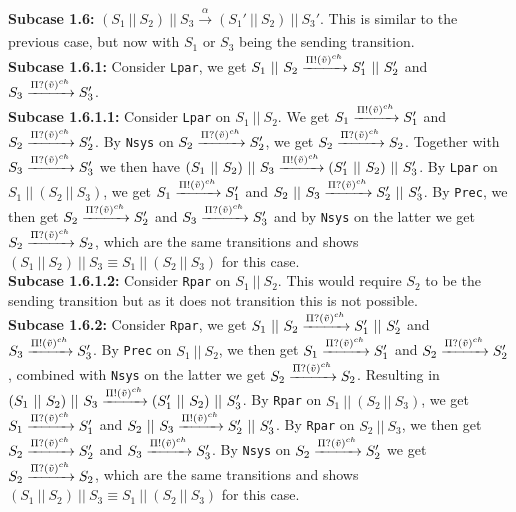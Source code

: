 \indent \textbf{Subcase 1.6: }$(S_1 \ || \ S_2)\ ||\ S_3 \xrightarrow[]{\alpha} (S_1' \ || \ S_2)\ ||\ S_3'$. This is similar to the previous case, but now with $S_1$ or $S_3$ being the sending transition.\\
\indent \indent \textbf{Subcase 1.6.1: } Consider \texttt{Lpar}, we get $S_1 \ || \ S_2 \xrightarrow[]{\Pi ! (\Tilde{v})^{ch}} S_1' \ || \ S_2'$ and $S_3 \xrightarrow[]{\Pi ? (\Tilde{v})^{ch}} S_3'$.\\
\indent \indent \indent \textbf{Subcase 1.6.1.1: } Consider \texttt{Lpar} on $S_1\ ||\ S_2$. We get $S_1 \xrightarrow[]{\Pi ! (\Tilde{v})^{ch}} S_1'$ and $S_2 \xrightarrow[]{\Pi ? (\Tilde{v})^{ch}} S_2'$. By \texttt{Nsys} on $S_2 \xrightarrow[]{\Pi ? (\Tilde{v})^{ch}} S_2'$, we get $S_2 \xrightarrow[]{\Pi ? (\Tilde{v})^{ch}} S_2$. Together with $S_3 \xrightarrow[]{\Pi ? (\Tilde{v})^{ch}} S_3'$ we then have $(S_1 \ || \ S_2)\ ||\ S_3 \xrightarrow[]{\Pi ! (\Tilde{v})^{ch}} (S_1' \ || \ S_2)\ ||\ S_3'$. By \texttt{Lpar} on $S_1 \ ||\ (S_2 \ || \ S_3)$, we get $S_1 \xrightarrow[]{\Pi ! (\Tilde{v})^{ch}} S_1'$ and $S_2 \ || \ S_3 \xrightarrow[]{\Pi ? (\Tilde{v})^{ch}} S_2' \ || \ S_3'$. By \texttt{Prec}, we then get $S_2 \xrightarrow[]{\Pi ? (\Tilde{v})^{ch}} S_2'$ and $S_3 \xrightarrow[]{\Pi ? (\Tilde{v})^{ch}} S_3'$ and by \texttt{Nsys} on the latter we get $S_2 \xrightarrow[]{\Pi ? (\Tilde{v})^{ch}} S_2$, which are the same transitions and shows $(S_1 \ ||\ S_2 )\ || \ S_3 \equiv S_1 \ ||\ (S_2 \ || \ S_3)$ for this case.\\
\indent \indent \indent \textbf{Subcase 1.6.1.2: } Consider \texttt{Rpar} on $S_1\ ||\ S_2$. This would require $S_2$ to be the sending transition but as it does not transition this is not possible.\\
\indent \indent \textbf{Subcase 1.6.2: } Consider \texttt{Rpar}, we get $S_1 \ || \ S_2 \xrightarrow[]{\Pi ? (\Tilde{v})^{ch}} S_1' \ || \ S_2'$ and $S_3 \xrightarrow[]{\Pi ! (\Tilde{v})^{ch}} S_3'$. By \texttt{Prec} on $S_1\ ||\ S_2$, we then get $S_1 \xrightarrow[]{\Pi ? (\Tilde{v})^{ch}} S_1'$ and $S_2 \xrightarrow[]{\Pi ? (\Tilde{v})^{ch}} S_2'$, combined with \texttt{Nsys} on the latter we get $S_2 \xrightarrow[]{\Pi ? (\Tilde{v})^{ch}} S_2$. Resulting in $(S_1 \ || \ S_2)\ ||\ S_3 \xrightarrow[]{\Pi ! (\Tilde{v})^{ch}} (S_1' \ || \ S_2)\ ||\ S_3'$. By \texttt{Rpar} on $S_1 \ ||\ (S_2 \ || \ S_3)$, we get $S_1 \xrightarrow[]{\Pi ? (\Tilde{v})^{ch}} S_1'$ and $S_2 \ || \ S_3 \xrightarrow[]{\Pi ! (\Tilde{v})^{ch}} S_2' \ || \ S_3'$. By \texttt{Rpar} on $S_2\ ||\ S_3$, we then get $S_2 \xrightarrow[]{\Pi ? (\Tilde{v})^{ch}} S_2'$ and $S_3 \xrightarrow[]{\Pi ! (\Tilde{v})^{ch}} S_3'$. By \texttt{Nsys} on $S_2 \xrightarrow[]{\Pi ? (\Tilde{v})^{ch}} S_2'$ we get $S_2 \xrightarrow[]{\Pi ? (\Tilde{v})^{ch}} S_2$, which are the same transitions and shows $(S_1 \ ||\ S_2 )\ || \ S_3 \equiv S_1 \ ||\ (S_2 \ || \ S_3)$ for this case.\\
